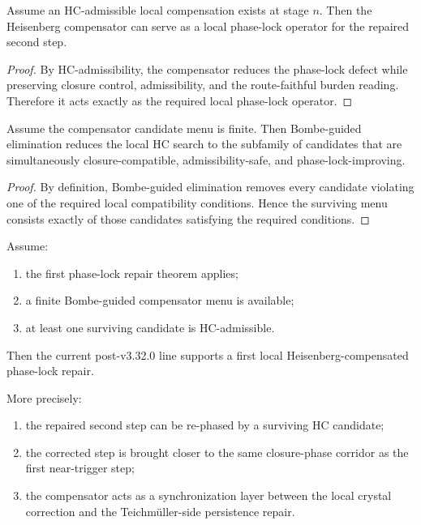 \begin{proposition}
\label{prop:hc-can-serve-as-local-phase-lock-operator}
Assume an HC-admissible local compensation exists at stage $n$. Then the Heisenberg compensator can serve as a local phase-lock operator for the repaired second step.
\end{proposition}

\begin{proof}
By HC-admissibility, the compensator reduces the phase-lock defect while preserving closure control, admissibility, and the route-faithful burden reading. Therefore it acts exactly as the required local phase-lock operator.
\end{proof}

\begin{lemma}
\label{lem:bombe-guided-hc-elimination-lemma}
Assume the compensator candidate menu is finite. Then Bombe-guided elimination reduces the local HC search to the subfamily of candidates that are simultaneously closure-compatible, admissibility-safe, and phase-lock-improving.
\end{lemma}

\begin{proof}
By definition, Bombe-guided elimination removes every candidate violating one of the required local compatibility conditions. Hence the surviving menu consists exactly of those candidates satisfying the required conditions.
\end{proof}

\begin{theorem}
\label{thm:first-local-heisenberg-compensator-theorem}
Assume:
\begin{enumerate}[leftmargin=2em,label=(\alph*)]
  \item the first phase-lock repair theorem applies;
  \item a finite Bombe-guided compensator menu is available;
  \item at least one surviving candidate is HC-admissible.
\end{enumerate}
Then the current post-v3.32.0 line supports a first local Heisenberg-compensated phase-lock repair.

More precisely:
\begin{enumerate}[leftmargin=2em,label=(\roman*)]
  \item the repaired second step can be re-phased by a surviving HC candidate;
  \item the corrected step is brought closer to the same closure-phase corridor as the first near-trigger step;
  \item the compensator acts as a synchronization layer between the local crystal correction and the Teichm\"uller-side persistence repair.
\end{enumerate}
\end{theorem}

